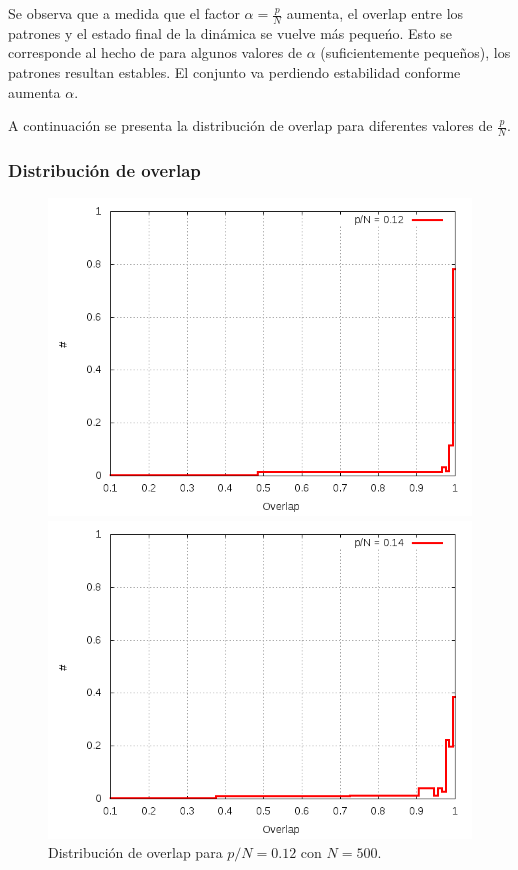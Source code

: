 \documentclass[aps,prb,onecolumn,10pt,floatfix,superscriptaddress]{article} %
\begin{document}
Se observa que a medida que el factor $\alpha = \frac{p}{N}$ aumenta, el overlap entre los patrones y el estado final de la din\'amica se vuelve m\'as peque\'no. Esto se corresponde al hecho de para algunos valores de $\alpha$ (suficientemente peque\~nos), los patrones resultan estables. El conjunto va perdiendo estabilidad conforme aumenta $\alpha$.

A continuaci\'on se presenta la distribuci\'on de overlap para diferentes valores de $\frac{p}{N}$.

\subsubsection{Distribuci\'on de overlap}


\begin{figure}[!htd] 
	\begin{minipage}[b]{0.450\linewidth}
   	    \includegraphics[scale=0.32 ]{Histo12.png}
   	    \begin{center}
  \caption{\label{Histo12} Distribuci\'on de overlap para $p/N = 0.12$ con $N=500$.}
     	    \end{center}
   \end{minipage}
   \begin{minipage}[b]{0.450\linewidth}
   	    \includegraphics[scale=0.32 ]{Histo14.png}

\end{minipage}
\end{figure}
\end{document}
